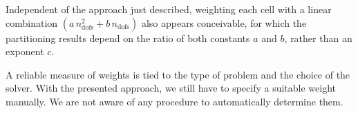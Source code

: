 Independent of the approach just described, weighting each cell with a linear combination $(a \, n_\text{dofs}^2 + b \, n_\text{dofs})$ also appears conceivable, for which the partitioning results depend on the ratio of both constants $a$ and $b$, rather than an exponent $c$.


A reliable measure of weights is tied to the type of problem and the choice of the solver. With the presented approach, we still have to specify a suitable weight manually. We are not aware of any procedure to automatically determine them.
